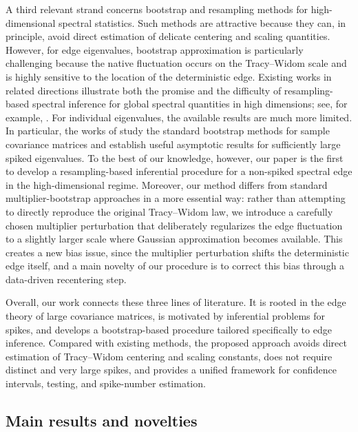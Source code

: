 \documentclass[12pt]{article}
\theoremstyle{plain}
\numberwithin{equation}{section}
\begin{document}
A third relevant strand concerns bootstrap and resampling methods for high-dimensional spectral statistics. Such methods are attractive because they can, in principle, avoid direct estimation of delicate centering and scaling quantities. However, for edge eigenvalues, bootstrap approximation is particularly challenging because the native fluctuation occurs on the Tracy--Widom scale and is highly sensitive to the location of the deterministic edge. Existing works in related directions illustrate both the promise and the difficulty of resampling-based spectral inference for global spectral quantities in high dimensions; see, for example, \citep{Dobriban2020,LopesBlandinoAue2019,el2019non,DetteRohde2024}. For individual eigenvalues, the available results are much more limited. In particular, the works of \citep{YuZhaoZhou2025,el2019non} study the standard bootstrap methods for sample covariance matrices and establish useful asymptotic results for sufficiently large spiked eigenvalues. To the best of our knowledge, however, our paper is the first to develop a resampling-based inferential procedure for a non-spiked spectral edge in the high-dimensional regime. Moreover, our method differs from standard multiplier-bootstrap approaches in a more essential way: rather than attempting to directly reproduce the original Tracy--Widom law, we introduce a carefully chosen multiplier perturbation that deliberately regularizes the edge fluctuation to a slightly larger scale where Gaussian approximation becomes available. This  creates a new bias issue, since the multiplier perturbation shifts the deterministic edge itself, and a main novelty of our procedure is to correct this bias through a data-driven recentering step.

Overall, our work connects these three lines of literature. It is rooted in the edge theory of large covariance matrices, is motivated by inferential problems for spikes, and develops a bootstrap-based procedure tailored specifically to edge inference. Compared with existing methods, the proposed approach avoids direct estimation of Tracy--Widom centering and scaling constants, does not require distinct and very large spikes, and provides a unified framework for confidence intervals, testing, and spike-number estimation.
\subsection{Main results and novelties}
\label{sec_overview}
\end{document}
